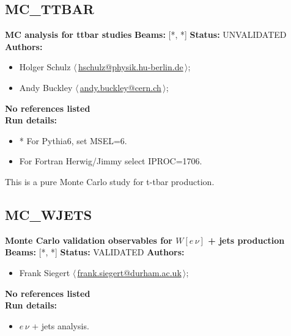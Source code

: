 \subsection{MC\_TTBAR}
\textbf{MC analysis for ttbar studies}\newline
\textbf{Beams:} [*, *] \newline
\textbf{Status:} UNVALIDATED\newline
\textbf{Authors:}
\begin{itemize}
  \item Holger Schulz $\langle\,$\href{mailto:hschulz@physik.hu-berlin.de}{hschulz@physik.hu-berlin.de}$\,\rangle$;
  \item Andy Buckley $\langle\,$\href{mailto:andy.buckley@cern.ch}{andy.buckley@cern.ch}$\,\rangle$;
\end{itemize}
\textbf{No references listed}\\ 
\textbf{Run details:}
\begin{itemize}

  \item * For Pythia6, set MSEL=6.
  \item For Fortran Herwig/Jimmy select IPROC=1706.\end{itemize}

\noindent This is a pure Monte Carlo study for t-tbar production.

\clearpage


\clearpage

\subsection{MC\_WJETS}
\textbf{Monte Carlo validation observables for $W[e \, \nu]$ + jets production}\newline
\textbf{Beams:} [*, *] \newline
\textbf{Status:} VALIDATED\newline
\textbf{Authors:}
\begin{itemize}
  \item Frank Siegert $\langle\,$\href{mailto:frank.siegert@durham.ac.uk}{frank.siegert@durham.ac.uk}$\,\rangle$;
\end{itemize}
\textbf{No references listed}\\ 
\textbf{Run details:}
\begin{itemize}

  \item $e \, \nu$ + jets analysis.\end{itemize}

